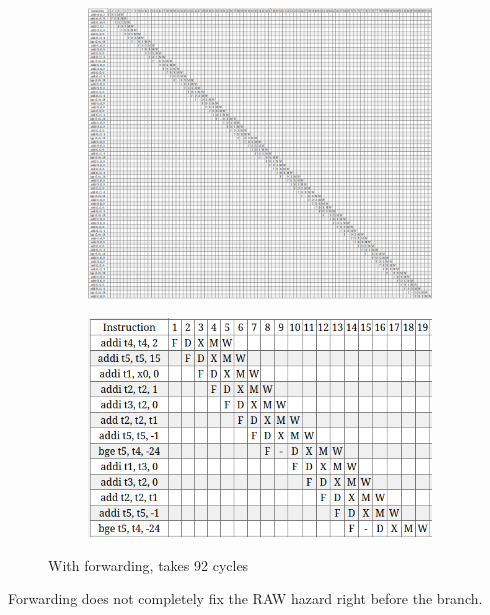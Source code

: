 \documentclass[11pt]{article}
\begin{document}
\begin{figure}[H]
\begin{subfigure}{.5\textwidth}
  \centering
  \includegraphics[width=\linewidth]{q1/bex/bad/f-92.png}
\end{subfigure}
\begin{subfigure}{.5\textwidth}
  \centering
  \includegraphics[width=\linewidth]{q1/bex/bad/f-loop.png}
\end{subfigure}
\caption{With forwarding, takes 92 cycles}
\end{figure}

Forwarding does not completely fix the RAW hazard right before the branch.

\newpage
\end{document}

